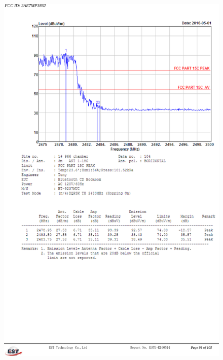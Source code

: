 \documentclass[12pt,a4paper]{report}
\begin{document}
	\leavevmode\thispagestyle{empty}\newpage
	
	\begin{figure}[H]
		\vspace{-2.5cm}
		\hspace{-3.5cm}
		\includegraphics[width=.9\paperwidth]{testa4.png}
	\end{figure}

	\leavevmode\thispagestyle{empty}\newpage
	
	
	
	\leavevmode\thispagestyle{empty}\newpage
	\leavevmode\thispagestyle{empty}\newpage
	
\end{document}
